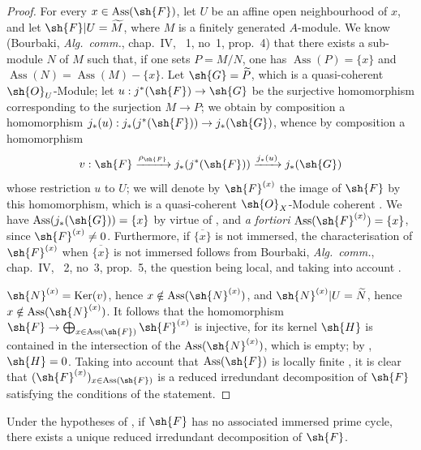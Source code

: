 \begin{proof}
For every $x\in\operatorname{Ass}(\sh{F})$, let $U$ be an affine open neighbourhood of $x$, and let $\sh{F}|U=\widetilde{M}$, where $M$ is a finitely generated $A$-module.
We know (Bourbaki, \emph{Alg.\ comm.}, chap.~IV, \textsection~1, no~1, prop.~4) that there exists a sub-module $N$ of $M$ such that, if one sets $P=M/N$, one has $\operatorname{Ass}(P)=\{x\}$ and $\operatorname{Ass}(N)=\operatorname{Ass}(M)-\{x\}$.
Let $\sh{G}=\widetilde{P}$, which is a quasi-coherent $\sh{O}_U$-Module; let $u:j^*(\sh{F})\to\sh{G}$ be the surjective homomorphism corresponding to the surjection $M\to P$; we obtain by composition a homomorphism $j_*(u):j_*(j^*(\sh{F}))\to j_*(\sh{G})$, whence by composition a homomorphism
\[
v:\sh{F}\xrightarrow{\rho_\sh{F}}j_*(j^*(\sh{F}))\xrightarrow{j_*(u)}j_*(\sh{G})
\]
whose restriction $u$ to $U$; we will denote by $\sh{F}^{(x)}$ the image of $\sh{F}$ by this homomorphism, which is a quasi-coherent $\sh{O}_X$-Module coherent .
We have $\operatorname{Ass}(j_*(\sh{G}))=\{x\}$ by virtue of , and \emph{a fortiori}  $\operatorname{Ass}(\sh{F}^{(x)})=\{x\}$, since $\sh{F}^{(x)}\neq 0$.
Furthermore, if $\overline{\{x\}}$ is not immersed, the characterisation of $\sh{F}^{(x)}$ when $\overline{\{x\}}$ is not immersed follows from Bourbaki, \emph{Alg.\ comm.}, chap.~IV, \textsection~2, no~3, prop.~5, the question being local, and taking into account .

$\sh{N}^{(x)}=\operatorname{Ker}(v)$, hence $x\notin\operatorname{Ass}(\sh{N}^{(x)})$, and $\sh{N}^{(x)}|U=\widetilde{N}$, hence $x\notin\operatorname{Ass}(\sh{N}^{(x)})$.
It follows that the homomorphism $\sh{F}\to\bigoplus_{x\in\operatorname{Ass}(\sh{F})}\sh{F}^{(x)}$ is injective, for its kernel $\sh{H}$ is contained in the intersection of the $\operatorname{Ass}(\sh{N}^{(x)})$, which is empty; by , $\sh{H}=0$.
Taking into account that $\operatorname{Ass}(\sh{F})$ is locally finite , it is clear that $(\sh{F}^{(x)})_{x\in\operatorname{Ass}(\sh{F})}$ is a reduced irredundant decomposition of $\sh{F}$ satisfying the conditions of the statement.
\end{proof}


\begin{corollary}[3.2.7]
\label{IV.3.2.7}
Under the hypotheses of , if $\sh{F}$ has no associated immersed prime cycle, there exists a unique reduced irredundant decomposition of $\sh{F}$.
\end{corollary}

